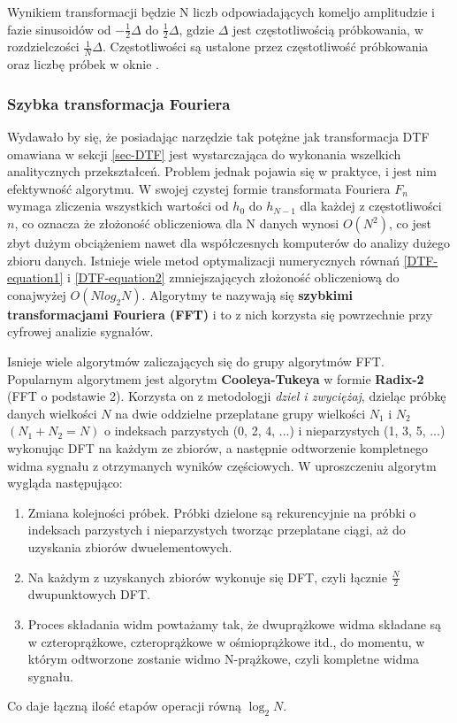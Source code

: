 \documentclass[12pt,a4paper,twoside]{mwart}
\begin{document}
Wynikiem transformacji będzie N liczb odpowiadających komeljo amplitudzie i fazie sinusoidów od $- \frac{1}{2} \Delta $ do $\frac{1}{2} \Delta $, gdzie $\Delta$ jest częstotliwością próbkowania, w rozdzielczości $\frac{1}{N} \Delta$. Częstotliwości są ustalone przez częstotliwość próbkowania oraz liczbę próbek w oknie \cite[198 - 200, 204-206]{CyfrowePrzetwarzanieSygnalowOdTeoriiDoZastosowan}.

\subsubsection{Szybka transformacja Fouriera} \label{sec-FFT}
Wydawało by się, że posiadając narzędzie tak potężne jak transformacja DTF omawiana w sekcji \ref{sec-DTF} jest wystarczająca do wykonania wszelkich analitycznych przekształceń. Problem jednak pojawia się w praktyce, i jest nim efektywność algorytmu. W swojej czystej formie transformata Fouriera $F_n$ wymaga zliczenia wszystkich wartości od $h_0$ do $h_{N-1}$ dla każdej z częstotliwości $n$, co oznacza że złożoność obliczeniowa dla N danych wynosi $O(N^2)$, co jest zbyt dużym obciążeniem nawet dla współczesnych komputerów do analizy dużego zbioru danych. Istnieje wiele metod optymalizacji numerycznych równań \ref{DTF-equation1} i \ref{DTF-equation2} zmniejszających złożoność obliczeniową do conajwyżej $O(N log_2 N)$. Algorytmy te nazywają się \textbf{szybkimi transformacjami Fouriera (FFT)} i to z nich korzysta się powrzechnie przy cyfrowej analizie sygnałów.

Isnieje wiele algorytmów zaliczających się do grupy algorytmów FFT. Popularnym algorytmem jest algorytm \textbf{Cooleya-Tukeya} w formie \textbf{Radix-2} (FFT o podstawie 2). Korzysta on z metodologji \textit{dziel i zwyciężaj}, dzieląc próbkę danych wielkości $N$ na dwie oddzielne przeplatane grupy wielkości $N_1$ i $N_2$ $(N_1 + N_2 = N)$ o indeksach parzystych (0, 2, 4, ...) i nieparzystych (1, 3, 5, ...) wykonując DFT na każdym ze zbiorów, a następnie odtworzenie kompletnego widma sygnału z otrzymanych wyników częściowych. W uproszczeniu algorytm wygląda następująco:
\begin{enumerate}
  \item{Zmiana kolejności próbek. Próbki dzielone są rekurencyjnie na próbki o indeksach parzystych i nieparzystych tworząc przeplatane ciągi, aż do uzyskania zbiorów dwuelementowych.}
  \item{Na każdym z uzyskanych zbiorów wykonuje się DFT, czyli łącznie $\frac{N}{2}$ dwupunktowych DFT.}
  \item{Proces składania widm powtażamy tak, że dwuprążkowe widma składane są w czteroprążkowe, czteroprążkowe w ośmioprążkowe itd., do momentu, w którym odtworzone zostanie widmo N-prążkowe, czyli kompletne widma sygnału.}
\end{enumerate}
Co daje łączną ilość etapów operacji równą $\log_2 N$. \cite[241-252]{CyfrowePrzetwarzanieSygnalowOdTeoriiDoZastosowan}
\end{document}
